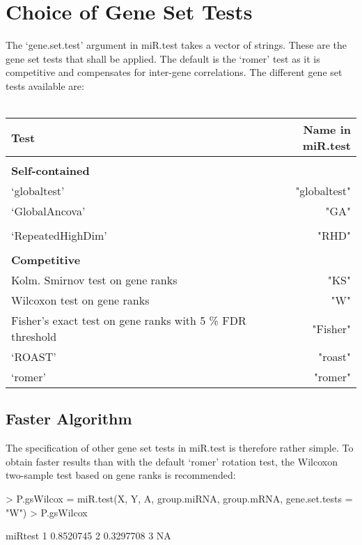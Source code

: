 \documentclass[12pt]{article}
\begin{document}
\section{Choice of Gene Set Tests}
The `gene.set.test' argument in miR.test takes a vector of strings. These are the gene set tests that shall be applied. The default is the `romer' test as it is competitive and compensates for inter-gene correlations. The different gene set tests available are:\\~\\
\begin{tabular}{lr}
\hline
\textbf{Test}&\textbf{Name in miR.test}\\
\hline
\\
\textbf{Self-contained}&\\
`globaltest' \cite[]{goeman_global_2004}&"globaltest"\\
`GlobalAncova'&"GA"\\
\citep{mansmann_testing_2005,hummel_globalancova:_2008}&\\
`RepeatedHighDim' \citep{brunner_repeated_2009}&"RHD"\\
\\
\textbf{Competitive}\\
Kolm. Smirnov test on gene ranks&"KS"\\
Wilcoxon test on gene ranks&"W"\\
Fisher's exact test on gene ranks with 5 \% FDR threshold&"Fisher"\\
`ROAST' \cite[]{wu_roast:_2010}&"roast"\\
`romer' \cite[]{majewski_opposing_2010}&"romer"\\
\hline
\end{tabular}
\subsection{Faster Algorithm}
The specification of other gene set tests in miR.test is therefore rather simple. To obtain faster results than with the default `romer' rotation test, the Wilcoxon two-sample test based on gene ranks is recommended:
\begin{Schunk}
\begin{Sinput}
> P.gsWilcox = miR.test(X, Y, A, group.miRNA, group.mRNA, gene.set.tests = "W")
> P.gsWilcox
\end{Sinput}
\begin{Soutput}
    miRtest
1 0.8520745
2 0.3297708
3        NA
\end{Soutput}
\end{Schunk}
\pagebreak
\end{document}
